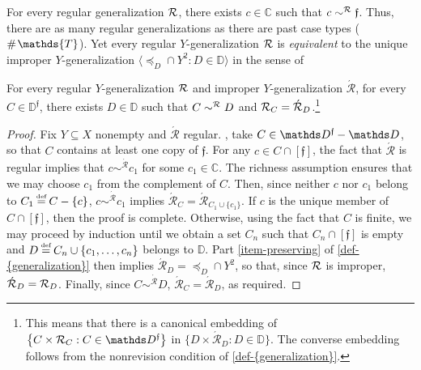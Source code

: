 \documentclass[12pt,a4paper,twoside]{article}
\newcommand{\novel}{\mathfrak f}
\newcommand{\preceqb}{\mathbin{\preceq}}
\newcommand{\countof}{\mathbin{\#}\hskip1pt}
\newcommand{\ext}{\mathrel{\mc R}}
\newcommand{\extb}{\mathbin{\mc R}}
\newcommand{\aext}{\mathrel{\acute{\mathrel{\mathcal R}}}}
\newcommand{\aextb}{\mathbin{\acute{\mathbin{\mathcal R}}}}
\newcommand{\mbbd}{{\mathds D}}
\newcommand{\mbbdp}{{\mathds D^{\novel}}}
\newcommand{\mbbc}{{\mathds C}}
\newcommand{\mbbt}{{\mathds {T}}}
\begin{document}
For every regular {generalization} $\ext$, there exists $c \in \mbbc$ such that
$c \sim^{\extb} \novel$. Thus, there are as many regular {generalization}s as there are
past case types (\ie\ $\countof \mbbt$).  Yet every regular $Y$-{generalization} $\ext$
is \emph{equivalent} to the unique improper $Y$-{generalization}
$\langle \preceqb_{D} \cap Y^{2}: D \in \mbbd\rangle$ in the sense of 
\begin{observation}\label{obs-reg-eq}%
  For every regular $Y$-{generalization} $\ext$ and improper $Y$-{generalization} $\aext$, for
  every $C \in \mbbdp$, there exists $D \in \mbbd$ such that
  $C \sim^{\extb} D$ and $\extb_{C} = \aextb_{D}$.\footnote{This means that
    there is a canonical embedding of
    $\left\{C \times \extb_{C}: C \in \mbbdp\right\}$ in
    $\{D \times \aextb_{D}: D \in \mbbd\}$. The converse embedding follows from
    the nonrevision condition of \cref{def-{generalization}}.} %
\end{observation}

\begin{proof}\label{proof-reg-eq} Fix $Y\subseteq
  X$ nonempty and $\aext$ regular.  \Wlog, take $C \in \mbbdp \bs \mbbd$, so
  that $C$ contains at least one copy of $\novel$.  For any $c \in C \cap
  [ \novel ]$, the fact that $\aext$ is regular implies that $c
  \sim^{\aextb} c _ 1$ for some $c _ 1 \in \mbbc$.  The richness assumption
  ensures that we may choose $c _ 1$ from the complement of $C$.  Then,
  since neither $c$ nor $c_{1}$ belong to $C _ 1 \defeq C \bs \{c\}$, $c
  \sim^{\aextb} c_{1}$ implies $\aextb_{C} = \aextb _ { C _ 1 \cup \{c_{1}\}
  }$.  If $c$ is the unique member of $C \cap [ \novel ]$, then the proof is
  complete.  Otherwise, using the fact that $C$ is finite, we may proceed by
  induction until we obtain a set $C _ n$ such that $C _ n \cap [\novel ]$
  is empty and $D \defeq C _ n \cup \{ c _ 1 , \dots , c _ n \}$ belongs to $\mbbd$.  Part \ref{item-preserving} of \cref{def-{generalization}} then implies $\aextb _ { D } = \preceqb _ { D } \cap Y^{2}$, so that, since $\ext$ is
  improper, $\aextb_{D}=\extb_{D}$.  Finally, since $C \sim ^{\aextb} D$, $\aextb _ { C } = \aextb_{D}$, as required.  \end{proof}
\end{document}
